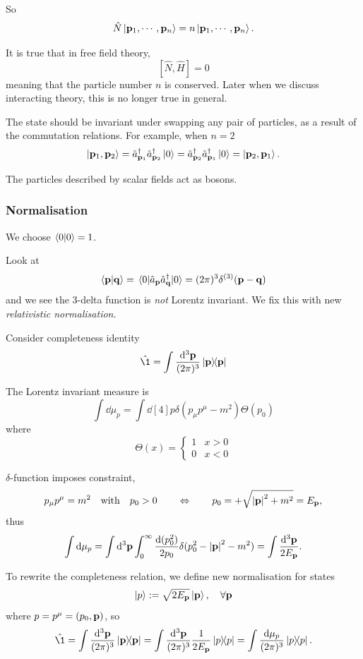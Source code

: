 \documentclass[a4paper,11pt]{article}
\begin{document}
	So
	\[
		\hat N \ket{\vb p_1, \cdots,\vb p_n} = n \ket{\vb p_1, \cdots, \vb p_n}.
	\]
	
	It is true that in free field theory,
	\[
		[\hat N ,\hat H] = 0
	\]
	meaning that the particle number $n$ is conserved. Later when we discuss interacting theory, this is no longer true in general.

	The state should be invariant under swapping any pair of particles, as a result of the commutation relations. For example, when $n = 2$ \[
		\ket{\vb p_1, \vb p_2} = \hat a^\dagger _{\vb p_1} \hat a^\dagger _{\vb p_2} \ket{0} = \hat a^\dagger _{\vb p_2} \hat a^\dagger _{\vb p_1} \ket{0} = \ket{\vb p_2, \vb p_1}.
	\]

	The particles described by scalar fields act as bosons.

	\subsubsection{Normalisation}
	We choose $\braket{0}{0} = 1$. 

	Look at
	\[
		\braket{\vb p}{\vb q} = \mel{0}{\hat a _{\vb p}\hat a^\dagger _{\vb q}}{0} = (2 \pi)^3 \delta ^{(3)}(\vb p - \vb q)
	\]
	and we see the 3-delta function is \emph{not} Lorentz invariant. We fix this with new \emph{relativistic normalisation}.

	Consider completeness identity
	\[
		\hat \1 = \int \ddk{\vb p}{3} \dyad{\vb p}{\vb p}
	\]

	 The Lorentz invariant measure is
	\[
		\int \dd{\mu_p} = \int \dd[4]{p} \delta (p_\mu p^\mu - m^2) \Theta(p_0)
	\]
	where
	\[
		\Theta(x) = \begin{cases}
			1 & x>0\\
			0 & x<0
		\end{cases}
	\]
	
	$\delta$-function imposes constraint, 
	\[
		p_\mu p^\mu = m^2 \quad \text{with} \quad p_0 > 0 \qquad \Leftrightarrow \qquad p_0 = + \sqrt{\abs{\vb p}^2 + m^2} = E _{\vb p},
	\]
	thus
	\[
		\int \dd{\mu _p} = \int \dd[3]{\vb p} \int_{0}^{\infty} \frac{\dd{(p_0^2)}}{2p_0} \delta(p_0^2 - \abs{\vb p}^2 - m^2) = \int \frac{\dd[3]{\vb p}}{2 E _{\vb p}}.
	\]
	
	To rewrite the completeness relation, we define new normalisation for states
	\[
		\ket{p} := \sqrt{2 E _{\vb p}} \ket{\vb p}, \quad \forall \vb p
	\]
	where $p = p^\mu = (p_0, \vb p)$, so
	\[
		\hat \1 = \int \ddk{\vb p}{3} \dyad{\vb p}{\vb p} = \int \ddk{\vb p}{3} \frac{1}{2 E _{\vb p}} \dyad{p}{p} = \int \frac{\dd{\mu_p}}{(2 \pi)^3} \dyad{p}{p}.
	\]
\end{document}
